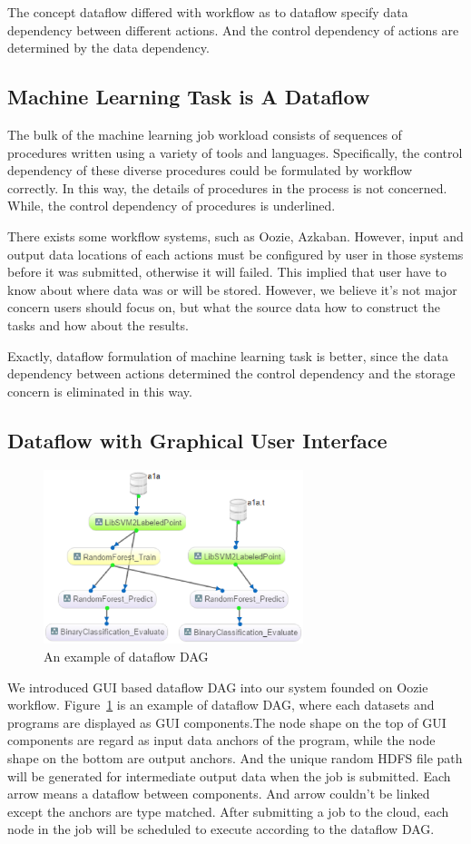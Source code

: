 \documentclass{sig-alternate-05-2015}
\begin{document}
The concept dataflow differed with workflow as to dataflow specify data dependency between different actions. And the control dependency of actions are determined by the data dependency.

\subsection{Machine Learning Task is A Dataflow}
The bulk of the machine learning job workload consists of sequences of procedures written using a variety of tools and languages. Specifically, the control dependency of these diverse procedures could be formulated by workflow correctly. In this way, the details of procedures in the process is not concerned. While, the control dependency of procedures is underlined. 

There exists some workflow systems, such as Oozie, Azkaban. However, input and output data locations of each actions must be configured by user in those systems before it was submitted, otherwise it will failed. This implied that user have to know about where data was or will be stored. However, we believe it's not major concern users should focus on, but what the source data  how to construct the tasks and how about the results. 

Exactly, dataflow formulation of machine learning task is better, since the data dependency between actions determined the control dependency and the storage concern is eliminated in this way. 

\subsection{Dataflow with Graphical User Interface}
\begin{figure}[!htb]
\centering
\includegraphics[height=2in]{dataflow_DAG.eps}
\caption{An example of dataflow DAG}
\label{fig:dag}
\end{figure}

We introduced GUI based dataflow DAG into our system founded on Oozie workflow. Figure~\ref{fig:dag} is an example of dataflow DAG, where each datasets and programs are displayed as GUI components.The node shape on the top of GUI components are regard as input data anchors of the program, while the node shape on the bottom are output anchors.  And the unique random HDFS file path will be generated for intermediate output data when the job is submitted. Each arrow means a dataflow between components. And arrow couldn't be linked except the anchors are type matched. After submitting a job to the cloud, each node in the job will be scheduled to execute according to the dataflow DAG. 
\end{document}

